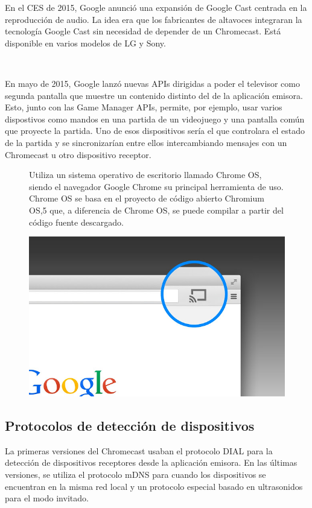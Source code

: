 En el CES de 2015, Google anunció una expansión de Google Cast centrada en la reproducción de audio.
La idea era que los fabricantes de altavoces integraran la tecnología Google Cast sin necesidad de depender de un Chromecast.
Está disponible en varios modelos de LG y Sony.

\

En mayo de 2015, Google lanzó nuevas APIs dirigidas a poder el televisor como segunda pantalla que muestre un contenido distinto del de la aplicación emisora.
Esto, junto con las Game Manager APIs, permite, por ejemplo, usar varios dispostivos como mandos en una partida de un videojuego y una pantalla común que proyecte la partida.
Uno de esos dispositivos sería el que controlara el estado de la partida y se sincronizarían entre ellos intercambiando mensajes con un Chromecast u otro dispositivo receptor.

\begin{figure}[ht]
	\begin{minipage}[b]{0.55\linewidth}
	Utiliza un sistema operativo de escritorio llamado Chrome OS, siendo el navegador Google Chrome su principal herramienta de uso.
	Chrome OS se basa en el proyecto de código abierto Chromium OS,5 que, a diferencia de Chrome OS, se puede compilar a partir del código fuente descargado.
	\end{minipage}%
	\begin{minipage}[b]{0.45\linewidth}
		\centering
		\includegraphics[width=.65\linewidth]{./Imagenes/googlecastbrowser.jpg}
	\end{minipage}
\end{figure}

\subsection{Protocolos de detección de dispositivos}

La primeras versiones del Chromecast usaban el protocolo DIAL para la detección de dispositivos receptores desde la aplicación emisora.
En las últimas versiones, se utiliza el protocolo mDNS para cuando los dispositivos se encuentran en la misma red local y un protocolo especial basado en ultrasonidos para el modo invitado.

